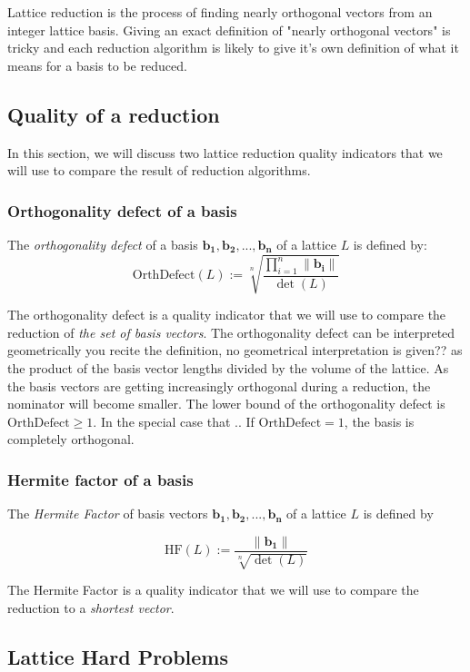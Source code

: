 \documentclass[10pt, a4paper]{article}
\newcommand{\my}[1]{{\color{blue} #1 }}
\renewcommand{\vec}[1]{\mathbf{#1}}
\begin{document}
Lattice reduction is the process of finding nearly orthogonal vectors from an integer lattice basis. Giving an exact definition of "nearly orthogonal vectors" is tricky and each reduction algorithm is likely to give it's own definition of what it means for a basis to be reduced.

\subsection{Quality of a reduction}

In this section, we will discuss two lattice reduction quality indicators that we will use to compare the result of reduction algorithms.

\subsubsection{Orthogonality defect of a basis}
\label{sec:orthogonalityDefect}
The \emph{orthogonality defect} of a basis $\vec{b_1},\vec{b_2},...,\vec{b_n}$ of a lattice $L$ is defined by:
\[
    \text{OrthDefect}(L) :=  \sqrt[n]{\frac{\displaystyle\prod^{n}_{i=1} \|\vec{b_i}\| }{\det(L)}}
\]

The orthogonality defect is a quality indicator that we will use to compare the reduction of \emph{the set of basis vectors}. The orthogonality defect can be interpreted geometrically \my{you recite the definition, no geometrical interpretation is given??} as the product of the basis vector lengths divided by the volume of the lattice. As the basis vectors are getting increasingly orthogonal during a reduction, the nominator will become smaller. The lower bound of the orthogonality defect is $\text{OrthDefect} \ge 1$. \my{In the special case that ..}If $\text{OrthDefect} = 1$, the basis is completely orthogonal.

\subsubsection{Hermite factor of a basis}
\label{sec:hermiteFactor}
The \emph{Hermite Factor} of basis vectors $\vec{b_1}, \vec{b_2},...,\vec{b_n}$ of a lattice $L$ is defined by

\[
    \text{HF}(L) := \frac{\|\vec{b_1}\|}{\sqrt[n]{\det(L)}}
\]

The Hermite Factor is a quality indicator that we will use to compare the reduction to a \emph{shortest vector}.

\subsection{Lattice Hard Problems}
\end{document}
